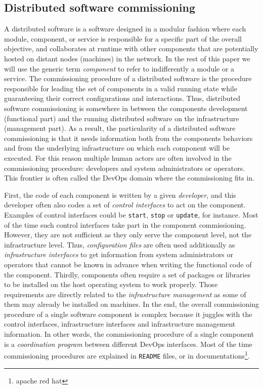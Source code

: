 
\subsection{Distributed software commissioning}

A distributed software is a software designed in a modular fashion
where each module, component, or service is responsible for a
specific part of the overall objective, and collaborates at runtime
with other components that are potentially hosted on distant nodes
(\ie machines) in the network. In the rest of this paper we will
use the generic term \emph{component} to refer to
indifferently a module or a service.
%
The commissioning procedure of a distributed software is the procedure
responsible for leading the set of components in a valid running state
while guaranteeing their correct configurations and
interactions. Thus, distributed software commissioning is somewhere in
between the components development (functional part) and the running
distributed software on the infrastructure (management part). As a
result, the particularity of a distributed software commissioning is
that it needs information both from the components behaviors and from the
underlying infrastructure on which each component will be executed.
For this reason multiple human actors are often involved in the
commissioning procedure: developers and system administrators or
operators. This frontier is often called the DevOps domain where the
commissioning fits in.

First, the code of each component is written by a given
\emph{developer}, and this developer often also codes a set of
\emph{control interfaces} to act on the component. Examples of control
interfaces could be \texttt{start}, \texttt{stop} or \texttt{update},
for instance. Most of the time such control interfaces take part in
the component commissioning. However, they are not sufficient as they
only serve the component level, not the infrastructure level. Thus,
\emph{configuration files} are often used additionally as
\emph{infrastructure interfaces} to get information from system
administrators or operators that cannot be known in advance when
writing the functional code of the component. Thirdly, components often
require a set of packages or libraries to be installed on the host
operating system to work properly. Those requirements are directly
related to the \emph{infrastructure management} as some of them may
already be installed on machines. In the end, the overall
commissioning procedure of a single software component is complex because
it juggles with the control interfaces, infrastructure interfaces and
infrastructure management information. In other words, the
commissioning procedure of a single component is a \emph{coordination
  program} between different DevOps interfaces. Most of the time
commissioning procedures are explained in \texttt{README} files, or in
documentations\footnote{apache red hat}.

